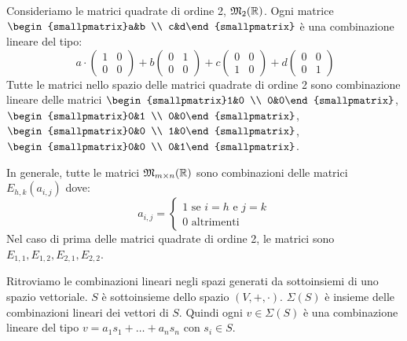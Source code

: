 Consideriamo le matrici quadrate di ordine 2, $\mathfrak{M}_2 (\mathbb{R})$. Ogni matrice $\begin{smallpmatrix}a&b \\ c&d\end{smallpmatrix}$ \`e una combinazione lineare del tipo:
\[\
a \cdot
\begin{pmatrix}
1 & 0 \\
0 & 0 
\end{pmatrix}
+ b 
\begin{pmatrix}
0 & 1 \\
0 & 0 
\end{pmatrix}
+ c 
\begin{pmatrix}
0 & 0 \\
1 & 0 
\end{pmatrix}
+ d 
\begin{pmatrix}
0 & 0 \\
0 & 1
\end{pmatrix}
\]
Tutte le matrici nello spazio delle matrici quadrate di ordine 2 sono combinazione lineare delle matrici $\begin{smallpmatrix}1&0 \\ 0&0\end{smallpmatrix}$, $\begin{smallpmatrix}0&1 \\ 0&0\end{smallpmatrix}$, $\begin{smallpmatrix}0&0 \\ 1&0\end{smallpmatrix}$, $\begin{smallpmatrix}0&0 \\ 0&1\end{smallpmatrix}$.

In generale, tutte le matrici $\mathfrak{M}_{m \times n} (\mathbb{R})$ sono combinazioni delle matrici $E_{h,k} (a_{i,j})$ dove:
\[
a_{i,j} = 
\begin{cases}
1 \text{ se } i = h \text{ e } j = k \\
0 \text{ altrimenti}
\end{cases}
\]
Nel caso di prima delle matrici quadrate di ordine 2, le matrici sono $E_{1,1}, E_{1,2}, E_{2,1}, E_{2,2}$.

Ritroviamo le combinazioni lineari negli spazi generati da sottoinsiemi di uno spazio vettoriale. $S$ \`e sottoinsieme dello spazio $(V, +, \cdot)$. $\Sigma (S)$ \`e insieme delle combinazioni lineari dei vettori di $S$. Quindi ogni $v \in \Sigma(S)$ \`e una combinazione lineare del tipo $v = a_1 s_1 + \dots + a_n s_n$ con $s_i \in S$.

